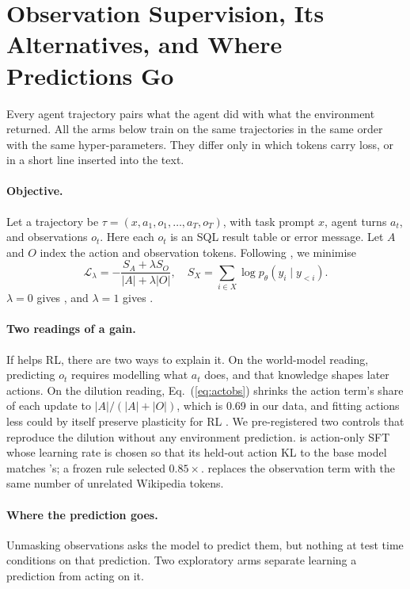 \section{Observation Supervision, Its Alternatives, and Where Predictions Go}
\label{sec:method}

Every agent trajectory pairs what the agent did with what the environment returned. All the arms below train on the same trajectories in the same order with the same hyper-parameters. They differ only in which tokens carry loss, or in a short line inserted into the text.

\paragraph{Objective.}
Let a trajectory be $\tau=(x,a_1,o_1,\dots,a_T,o_T)$, with task prompt $x$, agent turns $a_t$, and observations $o_t$. Here each $o_t$ is an SQL result table or error message. Let $A$ and $O$ index the action and observation tokens. Following \citet{zhang2026actobs}, we minimise
\begin{equation}
\mathcal{L}_\lambda = -\frac{S_A + \lambda S_O}{|A|+\lambda|O|},\quad
S_X=\sum_{i\in X}\log p_\theta(y_i\mid y_{<i}).
\label{eq:actobs}
\end{equation}
$\lambda=0$ gives \armA{}, and $\lambda=1$ gives \armB{}.

\paragraph{Two readings of a gain.}
If \armB{} helps RL, there are two ways to explain it. On the world-model reading, predicting $o_t$ requires modelling what $a_t$ does, and that knowledge shapes later actions. On the dilution reading, Eq.~(\ref{eq:actobs}) shrinks the action term's share of each update to $|A|/(|A|+|O|)$, which is 0.69 in our data, and fitting actions less could by itself preserve plasticity for RL \citep{plasticity2026}. We pre-registered two controls that reproduce the dilution without any environment prediction. \armC{} is action-only SFT whose learning rate is chosen so that its held-out action KL to the base model matches \armB's; a frozen rule selected $0.85\times$. \armD{} replaces the observation term with the same number of unrelated Wikipedia tokens.

\paragraph{Where the prediction goes.}
Unmasking observations asks the model to predict them, but nothing at test time conditions on that prediction. Two exploratory arms separate learning a prediction from acting on it.

